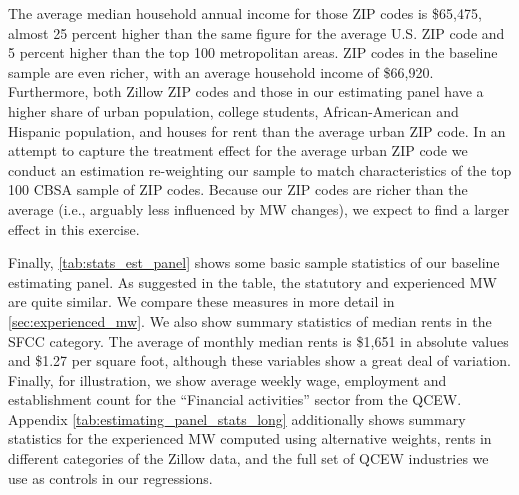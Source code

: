 The average median household annual income for those ZIP codes is \$65,475, almost 25 
percent higher than the same figure for the average U.S. ZIP code and 5 percent higher than 
the top 100 metropolitan areas. ZIP codes in the baseline sample are even richer, with an
average household income of \$66,920. Furthermore, both Zillow ZIP codes and those in our 
estimating panel have a higher share of urban population, college students, African-American
and Hispanic population, and houses for rent than the average urban ZIP code. In an attempt 
to capture the treatment effect for the average urban ZIP code we conduct an estimation 
re-weighting our sample to match characteristics of the top 100 CBSA sample of ZIP codes. 
Because our ZIP codes are richer than the average (i.e., arguably less influenced by MW
changes), we expect to find a larger effect in this exercise.

Finally, \autoref{tab:stats_est_panel} shows some basic sample statistics of our 
baseline estimating panel. As suggested in the table, the statutory and experienced MW 
are quite similar. We compare these measures in more detail in \autoref{sec:experienced_mw}.
We also show summary statistics of median rents in the SFCC category. The average of 
monthly median rents is \$1,651 in absolute values and \$1.27 per square foot, although 
these variables show a great deal of variation. Finally, for illustration, we show average 
weekly wage, employment and establishment count for the ``Financial activities'' sector 
from the QCEW. Appendix \autoref{tab:estimating_panel_stats_long} additionally shows 
summary statistics for the experienced MW computed using alternative weights, rents in 
different categories of the Zillow data, and the full set of QCEW industries we use as 
controls in our regressions.

